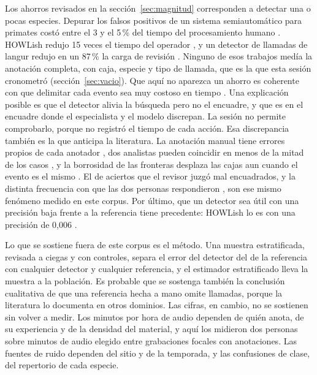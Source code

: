  Los ahorros revisados en la
sección~\ref{sec:magnitud} corresponden a detectar una o pocas especies. Depurar
los falsos positivos de un sistema semiautomático para primates costó entre el 3 y
el 5\,\% del tiempo del procesamiento humano \citep{heinicke_2015}. HOWLish redujo
15 veces el tiempo del operador \citep{Campos_Krofel_Rio-Maior_Renna_2025}, y un
detector de llamadas de langur redujo en un 87\,\% la carga de revisión
\citep{hong_deep_2026}. Ninguno de esos trabajos medía la anotación completa, con
caja, especie y tipo de llamada, que es la que esta sesión cronometró
(sección~\ref{sec:vacio}). Que aquí no aparezca un ahorro es coherente con que
delimitar cada evento sea muy costoso en tiempo \citep{koga_lead_2024}. Una
explicación posible es que el detector alivia la búsqueda pero no el encuadre, y
que es en el encuadre donde el especialista y el modelo discrepan. La sesión no
permite comprobarlo, porque no registró el tiempo de cada acción. Esa discrepancia
también es la que anticipa la literatura. La anotación manual tiene errores
propios de cada anotador \citep{nguyen_assessing_2021}, dos analistas pueden
coincidir en menos de la mitad de los casos \citep{leroy_reliability_2018}, y la
borrosidad de las fronteras desplaza las cajas aun cuando el evento es el mismo
\citep{zhu_sound_2025}. El \uControlsFraming{} de aciertos que el revisor juzgó mal
encuadrados, y la distinta frecuencia con que las dos personas respondieron
, son ese mismo fenómeno medido en este corpus. Por último, que un
detector sea útil con una precisión baja frente a la referencia tiene precedente:
HOWLish lo es con una precisión de 0,006 \citep{Campos_Krofel_Rio-Maior_Renna_2025}.

 Lo que se sostiene fuera de este corpus es el método. Una
muestra estratificada, revisada a ciegas y con controles, separa el error del
detector del de la referencia con cualquier detector y cualquier referencia, y el
estimador estratificado lleva la muestra a la población. Es probable que se
sostenga también la conclusión cualitativa de que una referencia hecha a mano
omite llamadas, porque la literatura lo documenta en otros dominios. Las cifras,
en cambio, no se sostienen sin volver a medir. Los minutos por hora de audio
dependen de quién anota, de su experiencia y de la densidad del material, y aquí
los midieron dos personas sobre \uSessionMinutes{} minutos de audio elegido entre
grabaciones focales con anotaciones. Las fuentes de ruido dependen del sitio y de
la temporada, y las confusiones de clase, del repertorio de cada especie.

